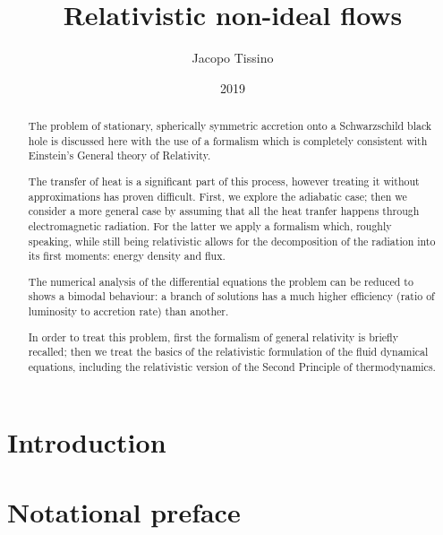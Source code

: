 \documentclass[a4paper, 11pt]{article}
\title{Relativistic non-ideal flows}
\author{Jacopo Tissino}
\date{2019}
\begin{document}



\begin{abstract}
The problem of stationary, spherically symmetric accretion onto a Schwarzschild black hole is discussed here with the use of a formalism which is completely consistent with Einstein's General theory of Relativity.

The transfer of heat is a significant part of this process, however treating it without approximations has proven difficult.
First, we explore the adiabatic case; then we consider a more general case by assuming that all the heat tranfer happens through electromagnetic radiation.
For the latter we apply a formalism which, roughly speaking, while still being relativistic allows for the decomposition of the radiation into its first moments: energy density and flux.

The numerical analysis of the differential equations the problem can be reduced to shows a bimodal behaviour: a branch of solutions has a much higher efficiency (ratio of luminosity to accretion rate) than another.

In order to treat this problem, first the formalism of general relativity is briefly recalled; then we treat the basics of the relativistic formulation of the fluid dynamical equations, including the relativistic version of the Second Principle of thermodynamics.
\end{abstract}

\setcounter{tocdepth}{2}
\tableofcontents

\section{Introduction} \label{sec:introduction}


\section{Notational preface} \label{sec:notational-preface}

\end{document}
